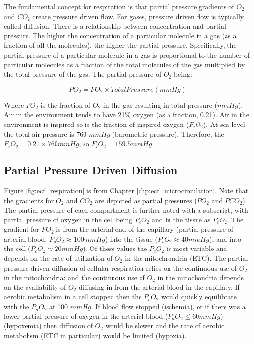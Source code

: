 The fundamental concept for respiration is that partial pressure gradients of $O_2$ and $CO_2$ create pressure driven flow. For gases, pressure driven flow is typically called diffusion. There is a relationship between concentration and partial pressure. The higher the concentration of a particular molecule in a gas (as a fraction of all the molecules), the higher the partial pressure. Specifically, the partial pressure of a particular molecule in a gas is proportional to the number of particular molecules as a fraction of the total molecules of the gas multiplied by the total pressure of the gas. The partial pressure of $O_2$ being:

\begin{equation}
    PO_2 = FO_2 \times Total Pressure (mmHg)
    \label{PO2}
\end{equation}

Where $FO_2$ is the fraction of $O_2$ in the gas resulting in total pressure ($mmHg$). Air in the environment tends to have 21\% oxygen (as a fraction, 0.21). Air in the environment is inspired so is the fraction of inspired oxygen ($F_iO_2$). At sea level the total air pressure is 760 $mmHg$ (barometric pressure). Therefore, the $F_iO_2 = 0.21 \times 760 mmHg$, so $F_iO_2 = 159.5 mmHg$. 

\subsection{Partial Pressure Driven Diffusion}

Figure \ref{fig:ecf_respiration} is from Chapter \ref{chp:ecf_microcirculation}. Note that the gradients for $O_2$ and $CO_2$ are depicted as partial pressures ($PO_2$ and $PCO_2$). The partial pressure of each compartment is further noted with a subscript, with partial pressure of oxygen in the cell being $P_cO_2$ and in the tissue as $P_tO_2$. The gradient for $PO_2$ is from the arterial end of the capillary (partial pressure of arterial blood, $P_aO_2 \approx 100 mmHg$) into the tissue ($P_tO_2 \approx 40 mmHg$), and into the cell ($P_cO_2 \approx 20 mmHg$). Of these values the $P_cO_2$ is most variable and depends on the rate of utilization of $O_2$ in the mitochrondria (ETC). The partial pressure driven diffusion of cellular respiration relies on the continuous use of $O_2$ in the mitochondria; and the continuous use of $O_2$ in the mitochondria depends on the availability of $O_2$ diffusing in from the arterial blood in the capillary. If aerobic metabolism in a cell stopped then the $P_cO_2$ would quickly equilibrate with the $P_aO_2$ at 100 $mmHg$. If blood flow stopped (ischemia), or if there was a lower partial pressure of oxygen in the arterial blood ($P_aO_2 \leq 60 mmHg$) (hypoxemia) then diffusion of $O_2$ would be slower and the rate of aerobic metabolism (ETC in particular) would be limited (hypoxia).

